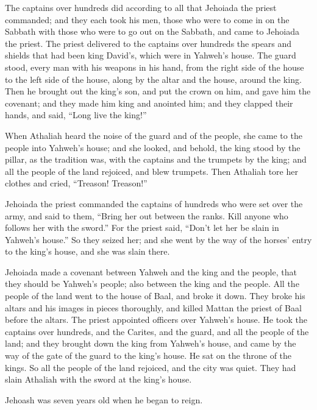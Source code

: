  The captains over hundreds did according to all that
Jehoiada the priest commanded; and they each took his men, those who
were to come in on the Sabbath with those who were to go out on the
Sabbath, and came to Jehoiada the priest.  The priest
delivered to the captains over hundreds the spears and shields that had
been king David's, which were in Yahweh's house.  The guard
stood, every man with his weapons in his hand, from the right side of
the house to the left side of the house, along by the altar and the
house, around the king.  Then he brought out the king's
son, and put the crown on him, and gave him the covenant; and they made
him king and anointed him; and they clapped their hands, and said,
``Long live the king!''

 When Athaliah heard the noise of the guard and of the
people, she came to the people into Yahweh's house;  and
she looked, and behold, the king stood by the pillar, as the tradition
was, with the captains and the trumpets by the king; and all the people
of the land rejoiced, and blew trumpets. Then Athaliah tore her clothes
and cried, ``Treason! Treason!''

 Jehoiada the priest commanded the captains of hundreds who
were set over the army, and said to them, ``Bring her out between the
ranks. Kill anyone who follows her with the sword.'' For the priest
said, ``Don't let her be slain in Yahweh's house.''  So
they seized her; and she went by the way of the horses' entry to the
king's house, and she was slain there.

 Jehoiada made a covenant between Yahweh and the king and
the people, that they should be Yahweh's people; also between the king
and the people.  All the people of the land went to the
house of Baal, and broke it down. They broke his altars and his images
in pieces thoroughly, and killed Mattan the priest of Baal before the
altars. The priest appointed officers over Yahweh's house. 
He took the captains over hundreds, and the Carites, and the guard, and
all the people of the land; and they brought down the king from Yahweh's
house, and came by the way of the gate of the guard to the king's house.
He sat on the throne of the kings.  So all the people of
the land rejoiced, and the city was quiet. They had slain Athaliah with
the sword at the king's house.

 Jehoash was seven years old when he began to reign.

